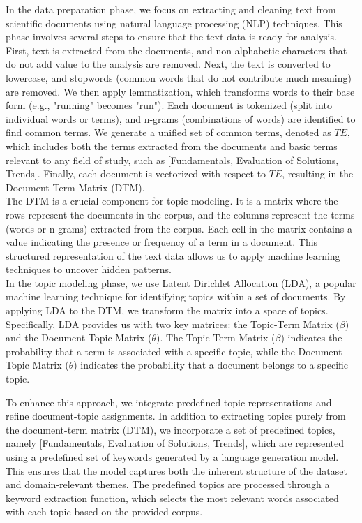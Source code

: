 \documentclass[runningheads]{llncs}
\begin{document}
In the data preparation phase, we focus on extracting and cleaning text from scientific documents using natural language processing (NLP) techniques. This phase involves several steps to ensure that the text data is ready for analysis. First, text is extracted from the documents, and non-alphabetic characters that do not add value to the analysis are removed. Next, the text is converted to lowercase, and stopwords (common words that do not contribute much meaning) are removed. We then apply lemmatization, which transforms words to their base form (e.g., "running" becomes "run"). Each document is tokenized (split into individual words or terms), and n-grams (combinations of words) are identified to find common terms. We generate a unified set of common terms, denoted as $TE$, which includes both the terms extracted from the documents and basic terms relevant to any field of study, such as [Fundamentals, Evaluation of Solutions, Trends]. Finally, each document is vectorized with respect to $TE$, resulting in the Document-Term Matrix (DTM).\\

The DTM is a crucial component for topic modeling. It is a matrix where the rows represent the documents in the corpus, and the columns represent the terms (words or n-grams) extracted from the corpus. Each cell in the matrix contains a value indicating the presence or frequency of a term in a document. This structured representation of the text data allows us to apply machine learning techniques to uncover hidden patterns.\\

In the topic modeling phase, we use Latent Dirichlet Allocation (LDA), a popular machine learning technique for identifying topics within a set of documents. By applying LDA to the DTM, we transform the matrix into a space of topics. Specifically, LDA provides us with two key matrices: the Topic-Term Matrix ($\beta$) and the Document-Topic Matrix ($\theta$). The Topic-Term Matrix ($\beta$) indicates the probability that a term is associated with a specific topic, while the Document-Topic Matrix ($\theta$) indicates the probability that a document belongs to a specific topic.

To enhance this approach, we integrate predefined topic representations and refine document-topic assignments. In addition to extracting topics purely from the document-term matrix (DTM), we incorporate a set of predefined topics, namely [Fundamentals, Evaluation of Solutions, Trends], which are represented using a predefined set of keywords generated by a language generation model. This ensures that the model captures both the inherent structure of the dataset and domain-relevant themes. The predefined topics are processed through a keyword extraction function, which selects the most relevant words associated with each topic based on the provided corpus.
\end{document}
